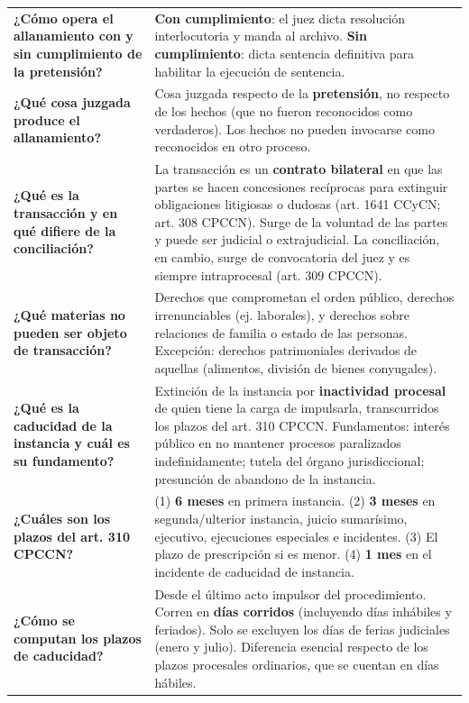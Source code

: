 \documentclass[12pt,oneside]{book}
\begin{document}
\begin{table}[H]
\begin{tabularx}{\textwidth}{
    >{\raggedright\arraybackslash}p{}
    >{\raggedright\arraybackslash}X
}
\textbf{¿Cómo opera el allanamiento con y sin cumplimiento de la pretensión?} &
\textbf{Con cumplimiento}: el juez dicta resolución interlocutoria y manda al archivo. \textbf{Sin cumplimiento}: dicta sentencia definitiva para habilitar la ejecución de sentencia. \\[0.6em]

\textbf{¿Qué cosa juzgada produce el allanamiento?} &
Cosa juzgada respecto de la \textbf{pretensión}, no respecto de los hechos (que no fueron reconocidos como verdaderos). Los hechos no pueden invocarse como reconocidos en otro proceso. \\[0.6em]

\textbf{¿Qué es la transacción y en qué difiere de la conciliación?} &
La transacción es un \textbf{contrato bilateral} en que las partes se hacen concesiones recíprocas para extinguir obligaciones litigiosas o dudosas (art. 1641 CCyCN; art. 308 CPCCN). Surge de la voluntad de las partes y puede ser judicial o extrajudicial. La conciliación, en cambio, surge de convocatoria del juez y es siempre intraprocesal (art. 309 CPCCN). \\[0.6em]

\textbf{¿Qué materias no pueden ser objeto de transacción?} &
Derechos que comprometan el orden público, derechos irrenunciables (ej. laborales), y derechos sobre relaciones de familia o estado de las personas. Excepción: derechos patrimoniales derivados de aquellas (alimentos, división de bienes conyugales). \\[0.6em]

\textbf{¿Qué es la caducidad de la instancia y cuál es su fundamento?} &
Extinción de la instancia por \textbf{inactividad procesal} de quien tiene la carga de impulsarla, transcurridos los plazos del art. 310 CPCCN. Fundamentos: interés público en no mantener procesos paralizados indefinidamente; tutela del órgano jurisdiccional; presunción de abandono de la instancia. \\[0.6em]

\textbf{¿Cuáles son los plazos del art. 310 CPCCN?} &
(1) \textbf{6 meses} en primera instancia. (2) \textbf{3 meses} en segunda/ulterior instancia, juicio sumarísimo, ejecutivo, ejecuciones especiales e incidentes. (3) El plazo de prescripción si es menor. (4) \textbf{1 mes} en el incidente de caducidad de instancia. \\[0.6em]

\textbf{¿Cómo se computan los plazos de caducidad?} &
Desde el último acto impulsor del procedimiento. Corren en \textbf{días corridos} (incluyendo días inhábiles y feriados). Solo se excluyen los días de ferias judiciales (enero y julio). Diferencia esencial respecto de los plazos procesales ordinarios, que se cuentan en días hábiles. \\[0.6em]


\end{tabularx}
\end{table}
\end{document}
